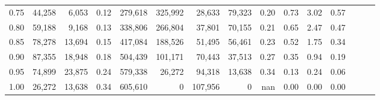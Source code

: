 \begin{tabular}{rrrrrrrrrrrrrrr}
0.75 &  44,258 &   6,053 &  0.12 &  279,618 &  325,992 &   28,633 &   79,323 &  0.20 &  0.73 &  3.02 &      0.57 \\
0.80 &  59,188 &   9,168 &  0.13 &  338,806 &  266,804 &   37,801 &   70,155 &  0.21 &  0.65 &  2.47 &      0.47 \\
0.85 &  78,278 &  13,694 &  0.15 &  417,084 &  188,526 &   51,495 &   56,461 &  0.23 &  0.52 &  1.75 &      0.34 \\
0.90 &  87,355 &  18,948 &  0.18 &  504,439 &  101,171 &   70,443 &   37,513 &  0.27 &  0.35 &  0.94 &      0.19 \\
0.95 &  74,899 &  23,875 &  0.24 &  579,338 &   26,272 &   94,318 &   13,638 &  0.34 &  0.13 &  0.24 &      0.06 \\
1.00 &  26,272 &  13,638 &  0.34 &  605,610 &        0 &  107,956 &        0 &   nan &  0.00 &  0.00 &      0.00 \\
\bottomrule
\end{tabular}

